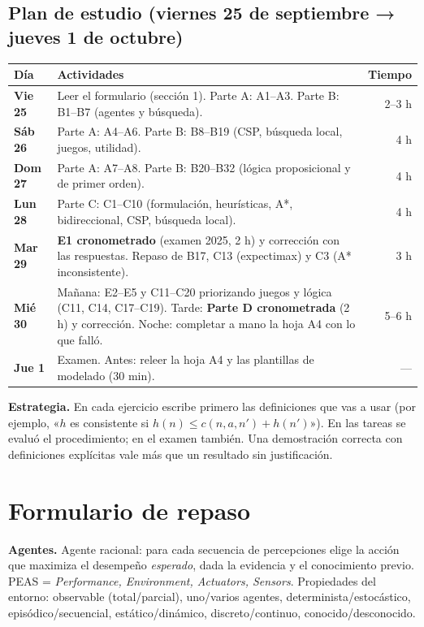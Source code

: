 \subsection*{Plan de estudio (viernes 25 de septiembre → jueves 1 de octubre)}
\begin{center}
\renewcommand{\arraystretch}{1.25}
\begin{tabularx}{\linewidth}{>{\bfseries}l X r}
\toprule
Día & Actividades & Tiempo \\
\midrule
Vie 25 & Leer el formulario (sección 1). Parte A: A1–A3. Parte B: B1–B7 (agentes y búsqueda). & 2–3 h\\
Sáb 26 & Parte A: A4–A6. Parte B: B8–B19 (CSP, búsqueda local, juegos, utilidad). & 4 h\\
Dom 27 & Parte A: A7–A8. Parte B: B20–B32 (lógica proposicional y de primer orden). & 4 h\\
Lun 28 & Parte C: C1–C10 (formulación, heurísticas, A*, bidireccional, CSP, búsqueda local). & 4 h\\
Mar 29 & \textbf{E1 cronometrado} (examen 2025, 2 h) y corrección con las respuestas. Repaso de B17, C13 (expectimax) y C3 (A* inconsistente). & 3 h\\
Mié 30 & Mañana: E2–E5 y C11–C20 priorizando juegos y lógica (C11, C14, C17–C19). Tarde: \textbf{Parte D cronometrada} (2 h) y corrección. Noche: completar a mano la hoja A4 con lo que falló. & 5–6 h\\
Jue 1 & Examen. Antes: releer la hoja A4 y las plantillas de modelado (30 min). & —\\
\bottomrule
\end{tabularx}
\end{center}

\begin{nota}
\textbf{Estrategia.} En cada ejercicio escribe primero las definiciones que vas a usar
(por ejemplo, «$h$ es consistente si $h(n)\le c(n,a,n')+h(n')$»). En las tareas se evaluó
el procedimiento; en el examen también. Una demostración correcta con definiciones explícitas
vale más que un resultado sin justificación.
\end{nota}

\newpage
\section{Formulario de repaso}

\begin{formulario}
\textbf{Agentes.} Agente racional: para cada secuencia de percepciones elige la acción que
maximiza el desempeño \emph{esperado}, dada la evidencia y el conocimiento previo.
PEAS = \emph{Performance, Environment, Actuators, Sensors}. Propiedades del entorno:
observable (total/parcial), uno/varios agentes, determinista/estocástico, episódico/secuencial,
estático/dinámico, discreto/continuo, conocido/desconocido.
\end{formulario}

